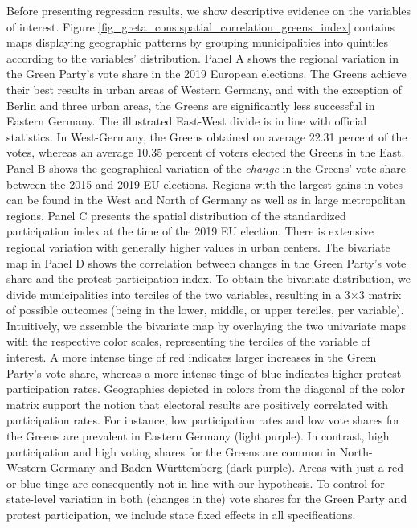 Before presenting regression results, we show descriptive evidence on the variables of interest. Figure \ref{fig_greta_cons:spatial_correlation_greens_index} contains maps displaying geographic patterns by grouping municipalities into quintiles according to the variables' distribution. Panel A shows the regional variation in the Green Party's vote share in the 2019 European elections. The Greens achieve their best results in urban areas of Western Germany, and with the exception of Berlin and three urban areas, the Greens are significantly less successful in Eastern Germany. The illustrated East-West divide is in line with official statistics. In West-Germany, the Greens obtained on average 22.31 percent of the votes, whereas an average 10.35 percent of voters elected the Greens in the East. Panel B shows the geographical variation of the \textit{change} in the Greens' vote share between the 2015 and 2019 EU elections. Regions with the largest gains in votes can be found in the West and North of Germany as well as in large metropolitan regions. Panel C presents the spatial distribution of the standardized participation index at the time of the 2019 EU election. There is extensive regional variation with generally higher values in urban centers. The bivariate map in Panel D shows the correlation between changes in the Green Party's vote share and the protest participation index. To obtain the bivariate distribution, we divide municipalities into terciles of the two variables, resulting in a 3$\times$3 matrix of possible outcomes (being in the lower, middle, or upper terciles, per variable). Intuitively, we assemble the bivariate map by overlaying the two univariate maps with the respective color scales, representing the terciles of the variable of interest. A more intense tinge of red indicates larger increases in the Green Party's vote share, whereas a more intense tinge of blue indicates higher protest participation rates. Geographies depicted in colors from the diagonal of the color matrix support the notion that electoral results are positively correlated with participation rates. For instance, low participation rates and low vote shares for the Greens are prevalent in Eastern Germany (light purple). In contrast, high participation and high voting shares for the Greens are common in North-Western Germany and Baden-Württemberg (dark purple). Areas with just a red or blue tinge are consequently not in line with our hypothesis. To control for state-level variation in both (changes in the) vote shares for the Green Party and protest participation, we include state fixed effects in all specifications.


